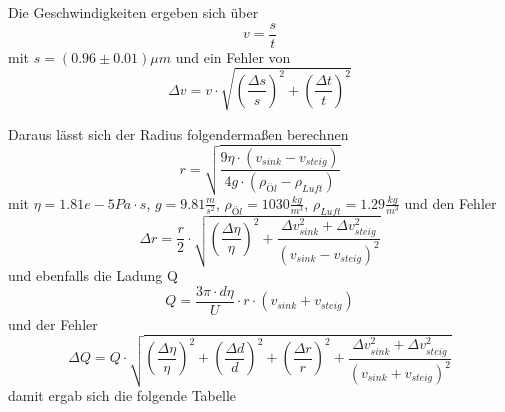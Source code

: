 \documentclass{scrartcl}
\begin{document}
	Die Geschwindigkeiten ergeben sich über
	\begin{equation}
		v = \frac{s}{t}
	\end{equation}
	mit $s = (0.96 \pm 0.01) \mu m$ und ein Fehler von
	\begin{equation}
		\Delta v = v \cdot \sqrt{(\frac{\Delta s}{s})^2 + (\frac{\Delta t}{t})^2} 
	\end{equation}

	Daraus lässt sich der Radius folgendermaßen berechnen
	\begin{equation}
		r = \sqrt{\frac{9\eta \cdot (v_{sink}-v_{steig})}{4 g \cdot (\rho_{Öl}-\rho_{Luft})}}
	\end{equation}
	mit $\eta = 1.81e-5 Pa\cdot s$, $g=9.81 \frac{m}{s^2}$, $\rho_{Öl} = 1030 \frac{kg}{m^3}$, $\rho_{Luft} = 1.29 \frac{kg}{m^3}$
	und den Fehler
	\begin{equation}
		\Delta r = \frac{r}{2} \cdot \sqrt{(\frac{\Delta \eta}{\eta})^2+\frac{\Delta v_{sink}^2+\Delta v_{steig}^2}{(v_{sink}-v_{steig})^2}}
	\end{equation}
	und ebenfalls die Ladung Q
	\begin{equation}
		Q = \frac{3\pi \cdot d\eta}{U} \cdot r \cdot (v_{sink}+v_{steig})
	\end{equation}
	und der Fehler
	\begin{equation}
		\Delta Q = Q \cdot \sqrt{(\frac{\Delta \eta}{\eta})^2 + (\frac{\Delta d}{d})^2+(\frac{\Delta r}{r})^2 + \frac{\Delta v_{sink}^2 + \Delta v_{steig}^2}{(v_{sink} + v_{steig})^2}}
	\end{equation}
	damit ergab sich die folgende Tabelle 
\end{document}
